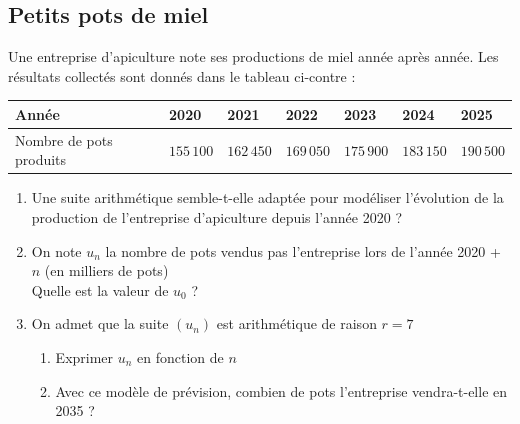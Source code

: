 \documentclass[oneside,12pt]{article}          %
\begin{document}
\subsection{Petits pots de miel}
Une entreprise d'apiculture note ses productions de miel année après année. Les résultats collectés sont donnés dans le tableau ci-contre :
\begin{center}
	\begin{tabular}{| P{2cm} | P{2cm} | P{2cm} | P{2cm} | P{2cm} | P{2cm} | P{2cm} |} \hline
		Année & 2020 & 2021 & 2022 & 2023 & 2024 & 2025 \\ \hline
		Nombre de pots produits & $155\,100$  & $162\,450$ & $169\,050$ & $175\,900$ & $183\,150$ & $190\,500$ \\ \hline
	\end{tabular}
\end{center}
\begin{enumerate}
	\item Une suite arithmétique semble-t-elle adaptée pour modéliser l'évolution de la production de l'entreprise d'apiculture depuis l'année 2020 ?
	\item On note $u_n$ la nombre de pots vendus pas l'entreprise lors de l'année 2020 + $n$ (en milliers de pots) \\
	Quelle est la valeur de $u_0$ ?
	\item On admet que la suite $(u_n)$ est arithmétique de raison $r = 7$
	\begin{enumerate}
		\item Exprimer $u_n$ en fonction de $n$
		\item Avec ce modèle de prévision, combien de pots l'entreprise vendra-t-elle en 2035 ?
	\end{enumerate}
\end{enumerate}
\end{document}
